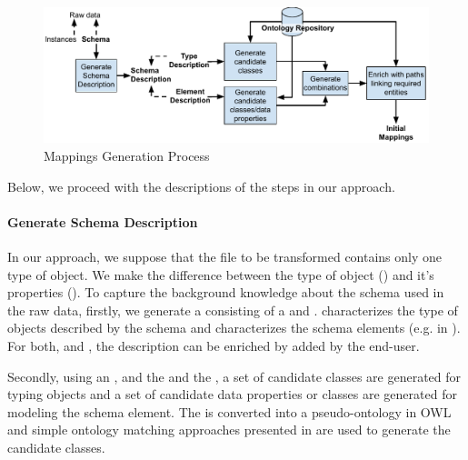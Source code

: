 \begin{figure}
	\centering
	\includegraphics[scale=0.55]{images/GeneralApproachPaper1.pdf}
	\caption{Mappings Generation Process }
	\label{fig:overviewApproach}
\end{figure}

Below, we proceed with the descriptions of the steps in our approach.

\paragraph{Generate Schema Description}
In our approach, we suppose that the file to be transformed contains only one type of object. We make the difference between the type of object () and it's properties (). To capture the background knowledge about the schema used in the raw data, firstly, we generate a  consisting of a  and .
 characterizes the type of objects described by the schema and  characterizes the schema elements (e.g.  in ). For both,  and , the description can be enriched by  added by the end-user.


Secondly, using an , and the  and the , a set of candidate classes are generated for typing objects and a set of candidate data properties or classes are generated for modeling the schema element.
The  is converted into a pseudo-ontology in OWL and simple ontology matching approaches presented in \cite{??} are used to generate the candidate classes.



